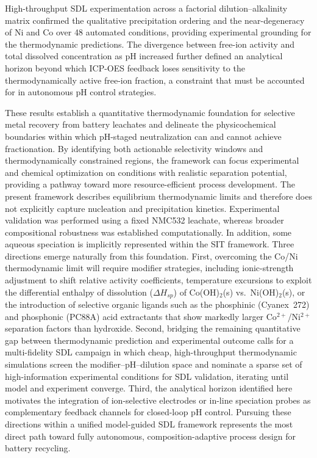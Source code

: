 \documentclass[final,2p,times]{elsarticle}
\begin{document}
High-throughput SDL experimentation across a factorial dilution--alkalinity matrix confirmed the qualitative precipitation ordering and the near-degeneracy of Ni and Co over 48 automated conditions, providing experimental grounding for the thermodynamic predictions. The divergence between free-ion activity and total dissolved concentration as pH increased further defined an analytical horizon beyond which ICP-OES feedback loses sensitivity to the thermodynamically active free-ion fraction, a constraint that must be accounted for in autonomous pH control strategies.

These results establish a quantitative thermodynamic foundation for selective metal recovery from battery leachates and delineate the physicochemical boundaries within which pH-staged neutralization can and cannot achieve fractionation. By identifying both actionable selectivity windows and thermodynamically constrained regions, the framework can focus experimental and chemical optimization on conditions with realistic separation potential, providing a pathway toward more resource-efficient process development. The present framework describes equilibrium thermodynamic limits and therefore does not explicitly capture nucleation and precipitation kinetics. Experimental validation was performed using a fixed NMC532 leachate, whereas broader compositional robustness was established computationally. In addition, some aqueous speciation is implicitly represented within the SIT framework. Three directions emerge naturally from this foundation. First, overcoming the Co/Ni thermodynamic limit will require modifier strategies, including ionic-strength adjustment to shift relative activity coefficients, temperature excursions to exploit the differential enthalpy of dissolution ($\Delta H_{sp}$) of Co(OH)$_2$(s) vs.\ Ni(OH)$_2$(s), or the introduction of selective organic ligands such as the phosphinic (Cyanex~272) and phosphonic (PC88A) acid extractants that show markedly larger Co$^{2+}$/Ni$^{2+}$ separation factors than hydroxide. Second, bridging the remaining quantitative gap between thermodynamic prediction and experimental outcome calls for a multi-fidelity SDL campaign in which cheap, high-throughput thermodynamic simulations screen the modifier--pH--dilution space and nominate a sparse set of high-information experimental conditions for SDL validation, iterating until model and experiment converge. Third, the analytical horizon identified here motivates the integration of ion-selective electrodes or in-line speciation probes as complementary feedback channels for closed-loop pH control. Pursuing these directions within a unified model-guided SDL framework represents the most direct path toward fully autonomous, composition-adaptive process design for battery recycling.
\end{document}

